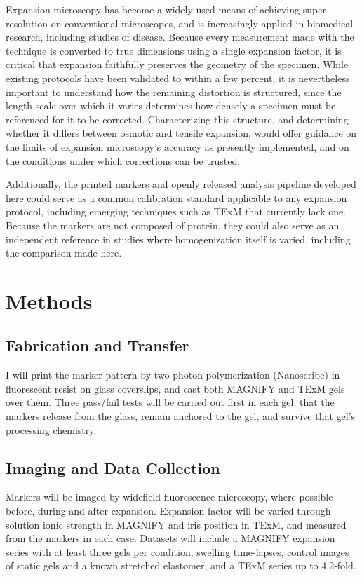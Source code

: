 \documentclass[%
 reprint,
 11pt,
 amsmath,amssymb,
 aps,
]{revtex4-2}
\begin{document}
Expansion microscopy has become a widely used means of achieving super-resolution on conventional microscopes, and is increasingly applied in biomedical research, including studies of disease.\cite{jcs,magnify} Because every measurement made with the technique is converted to true dimensions using a single expansion factor, it is critical that expansion faithfully preserves the geometry of the specimen.\cite{exm} While existing protocols have been validated to within a few percent,\cite{exm,proexm,magnify} it is nevertheless important to understand how the remaining distortion is structured, since the length scale over which it varies determines how densely a specimen must be referenced for it to be corrected.\cite{gelmap} Characterizing this structure, and determining whether it differs between osmotic and tensile expansion, would offer guidance on the limits of expansion microscopy's accuracy as presently implemented, and on the conditions under which corrections can be trusted.

Additionally, the printed markers and openly released analysis pipeline developed here could serve as a common calibration standard applicable to any expansion protocol, including emerging techniques such as TExM that currently lack one.\cite{texm} Because the markers are not composed of protein, they could also serve as an independent reference in studies where homogenization itself is varied, including the comparison made here.\cite{gelmap}


\section{Methods}
\subsection{Fabrication and Transfer}

I will print the marker pattern by two-photon polymerization (Nanoscribe) in fluorescent resist on glass coverslips, and cast both MAGNIFY and TExM gels over them.\cite{texm} Three pass/fail tests will be carried out first in each gel: that the markers release from the glass, remain anchored to the gel, and survive that gel's processing chemistry.\cite{magnify,texm}

\subsection{Imaging and Data Collection}

Markers will be imaged by widefield fluorescence microscopy, where possible before, during and after expansion. Expansion factor will be varied through solution ionic strength in MAGNIFY\cite{magnify} and iris position in TExM,\cite{texm} and measured from the markers in each case. Datasets will include a MAGNIFY expansion series with at least three gels per condition, swelling time-lapses, control images of static gels and a known stretched elastomer, and a TExM series up to 4.2-fold.
\end{document}

